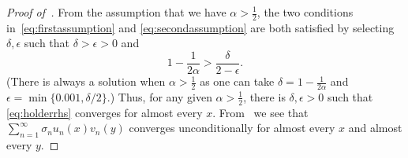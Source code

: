 \documentclass{article}
\begin{document}
\begin{proof}[Proof of~]
From the assumption that we have $\alpha>\frac{1}{2}$, the two conditions in~\cref{eq:firstassumption} and \cref{eq:secondassumption} are both satisfied by selecting $\delta,\epsilon$ such that $\delta>\epsilon>0$ and 
\begin{equation*}
    1- \frac{1}{2\alpha} > \frac{\delta}{2-\epsilon}. 
\end{equation*}
(There is always a solution when $\alpha>\frac{1}{2}$ as one can take $\delta = 1 - \frac{1}{2\alpha}$ and $\epsilon=\min\{0.001, \delta/2\}$.) Thus, for any given $\alpha>\frac{1}{2}$, there is $\delta, \epsilon>0$ such that \cref{eq:holderrhs} converges for almost every $x$. From~ we see that $\sum_{n=1}^\infty \sigma_n u_n(x)v_n(y)$ converges unconditionally for almost every $x$ and almost every $y$. 
\end{proof}
\end{document}
